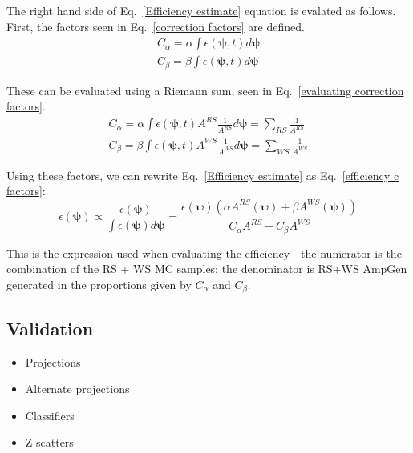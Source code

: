 \documentclass[note.tex]{subfiles}
\begin{document}
The right hand side of Eq.~\ref{Efficiency estimate} equation is evalated as follows.
First, the factors seen in Eq.~\ref{correction factors} are defined.
\begin{equation}
    \begin{aligned}
        C_\alpha = \alpha \int \epsilon(\mathbf{\psi}, t) d\mathbf{\psi} \\
        C_\beta = \beta \int \epsilon(\mathbf{\psi}, t) d\mathbf{\psi}
    \end{aligned}
    \label{correction factors}
\end{equation}

These can be evaluated using a Riemann sum, seen in Eq.~\ref{evaluating correction factors}.
\begin{equation}
    \begin{aligned}
        C_\alpha = \alpha \int \epsilon(\mathbf{\psi}, t) A^{RS}\frac{1}{A^{RS}}d\mathbf{\psi} = \sum_{RS}\frac{1}{A^{RS}} \\
        C_\beta = \beta \int \epsilon(\mathbf{\psi}, t)A^{WS} \frac{1}{A^{WS}} d\mathbf{\psi} = \sum_{WS}\frac{1}{A^{WS}}
    \end{aligned}
    \label{evaluating correction factors}
\end{equation}

Using these factors, we can rewrite Eq.~\ref{Efficiency estimate} as Eq.~\ref{efficiency c factors}:
\begin{equation}
        \epsilon(\mathbf{\psi}) \propto \frac{\epsilon(\mathbf{\psi})}{\int \epsilon(\mathbf{\psi}) d\mathbf{\psi}} = \frac{\epsilon(\mathbf{\psi})(\alpha A^{RS}(\mathbf{\psi}) + \beta A^{WS}(\mathbf{\psi}))}{C_\alpha A^{RS} + C_\beta A^{WS}}
    \label{efficiency c factors}
\end{equation}

This is the expression used when evaluating the efficiency - the numerator is the combination of the  RS + WS MC samples; the denominator is RS+WS AmpGen generated in the proportions given by $C_\alpha$ and $C_\beta$.

\subsection{Validation}
\begin{itemize}
    \item Projections
    \item Alternate projections
    \item Classifiers
    \item Z scatters
\end{itemize}
\end{document}
